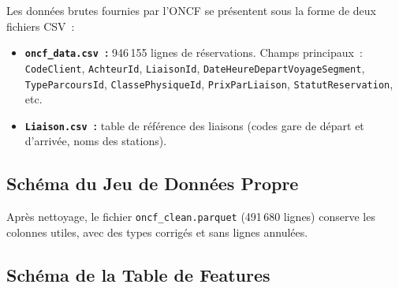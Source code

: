 \documentclass[12pt, a4paper]{report}
\begin{document}
Les données brutes fournies par l'ONCF se présentent sous la forme de
deux fichiers CSV~:

\begin{itemize}
\item \textbf{\texttt{oncf\_data.csv}~:} 946\,155 lignes de réservations.
    Champs principaux~: \texttt{CodeClient}, \texttt{AchteurId},
    \texttt{LiaisonId}, \texttt{DateHeureDepartVoyageSegment},
    \texttt{TypeParcoursId}, \texttt{ClassePhysiqueId}, \texttt{PrixParLiaison},
    \texttt{StatutReservation}, etc.
\item \textbf{\texttt{Liaison.csv}~:} table de référence des liaisons
    (codes gare de départ et d'arrivée, noms des stations).
\end{itemize}

\subsection{Schéma du Jeu de Données Propre}

Après nettoyage, le fichier \texttt{oncf\_clean.parquet} (491\,680 lignes)
conserve les colonnes utiles, avec des types corrigés et sans lignes annulées.

\subsection{Schéma de la Table de Features}
\end{document}
